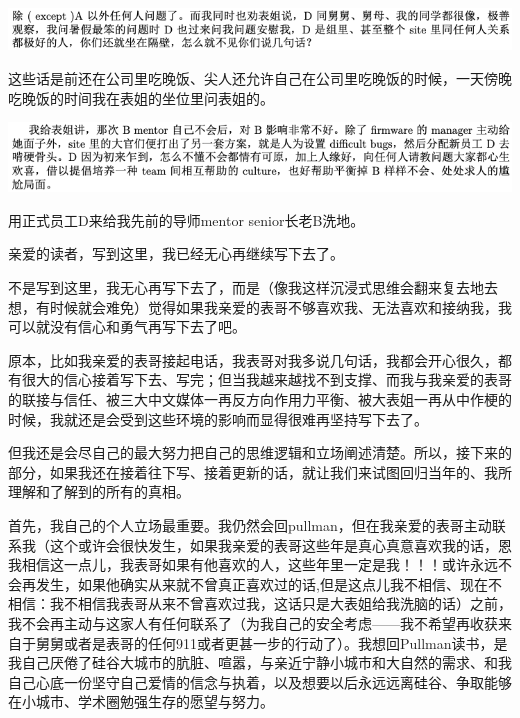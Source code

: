 \documentclass[9pt, b5paper]{article}
\begin{document}
\begin{center}
\includegraphics[width=.9\linewidth]{./pic/backups_plans_20210514_115233.png}
\end{center}

这些话是前还在公司里吃晚饭、尖人还允许自己在公司里吃晚饭的时候，一天傍晚吃晚饭的时间我在表姐的坐位里问表姐的。 

\begin{center}
\includegraphics[width=.9\linewidth]{./pic/backups_plans_20210514_115523.png}
\end{center}

用正式员工D来给我先前的导师mentor senior长老B洗地。 

亲爱的读者，写到这里，我已经无心再继续写下去了。

不是写到这里，我无心再写下去了，而是（像我这样沉浸式思维会翻来复去地去想，有时候就会难免）觉得如果我亲爱的表哥不够喜欢我、无法喜欢和接纳我，我可以就没有信心和勇气再写下去了吧。 

原本，比如我亲爱的表哥接起电话，我表哥对我多说几句话，我都会开心很久，都有很大的信心接着写下去、写完；但当我越来越找不到支撑、而我与我亲爱的表哥的联接与信任、被三大中文媒体一再反方向作用力平衡、被大表姐一再从中作梗的时候，我就还是会受到这些环境的影响而显得很难再坚持写下去了。 

但我还是会尽自己的最大努力把自己的思维逻辑和立场阐述清楚。所以，接下来的部分，如果我还在接着往下写、接着更新的话，就让我们来试图回归当年的、我所理解和了解到的所有的真相。

首先，我自己的个人立场最重要。我仍然会回pullman，但在我亲爱的表哥主动联系我（这个或许会很快发生，如果我亲爱的表哥这些年是真心真意喜欢我的话，恩我相信这一点儿，我表哥如果有他喜欢的人，这些年里一定是我！！！或许永远不会再发生，如果他确实从来就不曾真正喜欢过的话,但是这点儿我不相信、现在不相信：我不相信我表哥从来不曾喜欢过我，这话只是大表姐给我洗脑的话）之前，我不会再主动与这家人有任何联系了（为我自己的安全考虑——我不希望再收获来自于舅舅或者是表哥的任何911或者更甚一步的行动了）。我想回Pullman读书，是我自己厌倦了硅谷大城市的肮脏、喧嚣，与亲近宁静小城市和大自然的需求、和我自己心底一份坚守自己爱情的信念与执着，以及想要以后永远远离硅谷、争取能够在小城市、学术圈勉强生存的愿望与努力。
\end{document}
